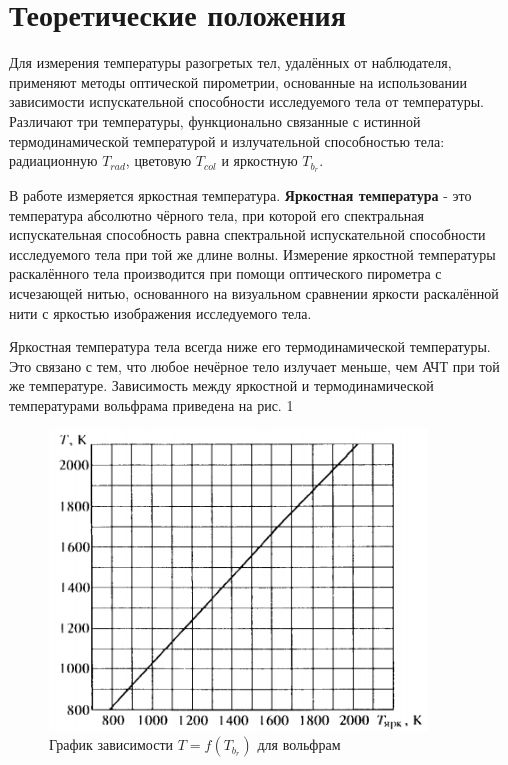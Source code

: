 \documentclass[a4paper, 12pt]{article}
\begin{document}
\section*{Теоретические положения}
Для измерения температуры разогретых тел, удалённых от наблюдателя, применяют методы оптической пирометрии, основанные на использовании зависимости испускательной способности исследуемого тела от температуры. Различают три температуры, функционально связанные с истинной термодинамической температурой и излучательной способностью тела: радиационную $T_{rad}$, цветовую $T_{col}$ и яркостную $T_b_r$. \par
В работе измеряется яркостная температура. \textbf{Яркостная температура} - это температура абсолютно чёрного тела, при которой его спектральная испускательная способность равна спектральной испускательной способности исследуемого тела при той же длине волны.
 Измерение яркостной температуры раскалённого тела производится при помощи оптического пирометра с исчезающей нитью, основанного на визуальном сравнении яркости раскалённой нити с яркостью изображения исследуемого тела. \par
Яркостная температура тела всегда ниже его термодинамической температуры. Это связано с тем, что любое нечёрное тело излучает меньше, чем АЧТ при той же температуре. Зависимость между яркостной и термодинамической температурами вольфрама приведена на рис. 1

\begin{figure}[h]
    \centering
    \includegraphics[width=10cm]{fig2.PNG}
    \caption{График зависимости $T = f(T_b_r)$ для вольфрам}
    \label{fig:vac}
\end{figure}
\end{document}
